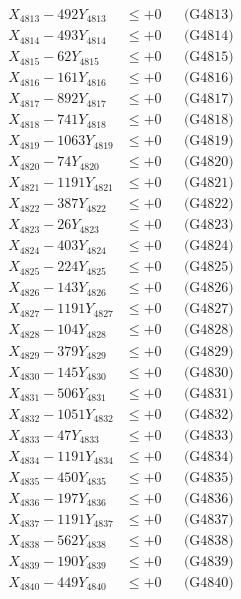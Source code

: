 \documentclass[a4paper,10pt]{article}
\begin{document}
{\begin{align}
X_{4813} - 492Y_{4813} &\leq +0 && \text{(G4813)} \\
X_{4814} - 493Y_{4814} &\leq +0 && \text{(G4814)} \\
X_{4815} - 62Y_{4815} &\leq +0 && \text{(G4815)} \\
X_{4816} - 161Y_{4816} &\leq +0 && \text{(G4816)} \\
X_{4817} - 892Y_{4817} &\leq +0 && \text{(G4817)} \\
X_{4818} - 741Y_{4818} &\leq +0 && \text{(G4818)} \\
X_{4819} - 1063Y_{4819} &\leq +0 && \text{(G4819)} \\
X_{4820} - 74Y_{4820} &\leq +0 && \text{(G4820)} \\
\allowbreak
X_{4821} - 1191Y_{4821} &\leq +0 && \text{(G4821)} \\
X_{4822} - 387Y_{4822} &\leq +0 && \text{(G4822)} \\
X_{4823} - 26Y_{4823} &\leq +0 && \text{(G4823)} \\
X_{4824} - 403Y_{4824} &\leq +0 && \text{(G4824)} \\
X_{4825} - 224Y_{4825} &\leq +0 && \text{(G4825)} \\
X_{4826} - 143Y_{4826} &\leq +0 && \text{(G4826)} \\
X_{4827} - 1191Y_{4827} &\leq +0 && \text{(G4827)} \\
X_{4828} - 104Y_{4828} &\leq +0 && \text{(G4828)} \\
X_{4829} - 379Y_{4829} &\leq +0 && \text{(G4829)} \\
X_{4830} - 145Y_{4830} &\leq +0 && \text{(G4830)} \\
\allowbreak
X_{4831} - 506Y_{4831} &\leq +0 && \text{(G4831)} \\
X_{4832} - 1051Y_{4832} &\leq +0 && \text{(G4832)} \\
X_{4833} - 47Y_{4833} &\leq +0 && \text{(G4833)} \\
X_{4834} - 1191Y_{4834} &\leq +0 && \text{(G4834)} \\
X_{4835} - 450Y_{4835} &\leq +0 && \text{(G4835)} \\
X_{4836} - 197Y_{4836} &\leq +0 && \text{(G4836)} \\
X_{4837} - 1191Y_{4837} &\leq +0 && \text{(G4837)} \\
X_{4838} - 562Y_{4838} &\leq +0 && \text{(G4838)} \\
X_{4839} - 190Y_{4839} &\leq +0 && \text{(G4839)} \\
X_{4840} - 449Y_{4840} &\leq +0 && \text{(G4840)} \\

\end{align}}
\end{document}
